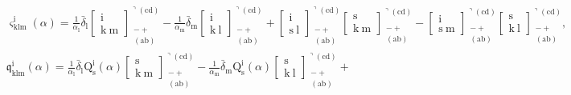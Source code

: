 \documentclass[12pt]{article}
\begin{document}
\begin{itemize}
\begin{equation}
\begin{aligned}
    & \varsigma^{\mathrm{i}}_{\mathrm{klm}}(\alpha) = \frac{1}{\alpha_\mathrm{l}} \bar{\delta}_\mathrm{l} \left[ \begin{matrix} \mathrm{i} \\ \mathrm{k\ m} \end{matrix} \right]^{\urcorner(\mathrm{cd})}_{\substack{- + \\ (\mathrm{ab})}} - \frac{1}{\alpha_\mathrm{m}} \bar{\delta}_\mathrm{m} \left[ \begin{matrix} \mathrm{i} \\ \mathrm{k\ l} \end{matrix} \right]^{\urcorner(\mathrm{cd})}_{\substack{- + \\ (\mathrm{ab})}} + \left[ \begin{matrix} \mathrm{i} \\ \mathrm{s\ l} \end{matrix} \right]^{\urcorner(\mathrm{cd})}_{\substack{- + \\ (\mathrm{ab})}} \left[ \begin{matrix} \mathrm{s} \\ \mathrm{k\ m} \end{matrix} \right]^{\urcorner(\mathrm{cd})}_{\substack{- + \\ (\mathrm{ab})}} - \left[ \begin{matrix} \mathrm{i} \\ \mathrm{s\ m} \end{matrix} \right]^{\urcorner(\mathrm{cd})}_{\substack{- + \\ (\mathrm{ab})}} \left[ \begin{matrix} \mathrm{s} \\ \mathrm{k\ l} \end{matrix} \right]^{\urcorner(\mathrm{cd})}_{\substack{- + \\ (\mathrm{ab})}}, \\
    & \mathfrak{q}^{\mathrm{i}}_{\mathrm{klm}}(\alpha) = \frac{1}{\alpha_\mathrm{l}} \bar{\delta}_\mathrm{l} \mathrm{Q}^{\mathrm{i}}_{\mathrm{s}}(\alpha) \left[ \begin{matrix} \mathrm{s} \\ \mathrm{k\ m} \end{matrix} \right]^{\urcorner(\mathrm{cd})}_{\substack{- + \\ (\mathrm{ab})}} - \frac{1}{\alpha_\mathrm{m}} \bar{\delta}_\mathrm{m} \mathrm{Q}^{\mathrm{i}}_{\mathrm{s}}(\alpha) \left[ \begin{matrix} \mathrm{s} \\ \mathrm{k\ l} \end{matrix} \right]^{\urcorner(\mathrm{cd})}_{\substack{- + \\ (\mathrm{ab})}} + \\

\end{aligned}
\end{equation}
\end{itemize}
\end{document}
